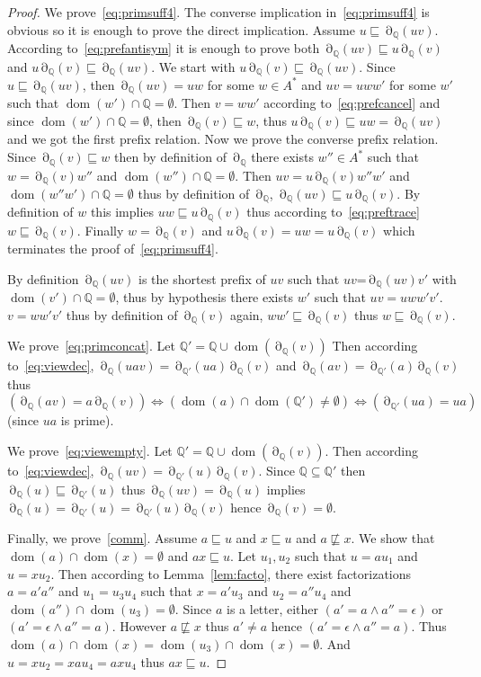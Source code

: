 \documentclass[a4paper,UKenglish]{lipics-v2016}
\newcommand{\QQ}{\mathbb{Q}}
\newcommand{\pref}{\sqsubseteq}
\DeclareMathOperator{\dom}{dom}
\DeclareMathOperator{\view}{\partial}
\begin{document}
\begin{proof}
We prove~\eqref{eq:primsuff4}.
The converse implication in~\eqref{eq:primsuff4} is obvious so it is enough 
to prove the direct implication.
Assume $u\pref \view_\QQ(uv)$.
According to~\eqref{eq:prefantisym}
it is enough to prove
both
$\view_\QQ(uv) \pref u\view_\QQ(v)$
and
$u\view_\QQ(v)\pref \view_\QQ(uv)$.
We start with $u\view_\QQ(v)\pref \view_\QQ(uv)$.
Since $u\pref \view_\QQ(uv)$, then $\view_\QQ(uv)=uw$ for some $w\in A^*$
and $uv=uww'$ for some $w'$ such that $\dom(w')\cap\QQ=\emptyset$.
Then $v=ww'$ according to~\eqref{eq:prefcancel}
and since $\dom(w')\cap \QQ=\emptyset$, then $\view_\QQ(v)\pref w$,
thus $u\view_\QQ(v)\pref uw=\view_\QQ(uv)$ and we got the first prefix relation.
Now we prove the converse prefix relation.
Since $\view_\QQ(v)\pref w$ then by definition of $\view_\QQ$ there exists $w''\in A^*$
such that $w=\view_\QQ(v) w''$ and $\dom(w'')\cap \QQ=\emptyset$.
Then $uv = u\view_\QQ(v) w''w'$ and $\dom(w''w')\cap\QQ=\emptyset$
thus by definition of $\view_\QQ$,
$\view_\QQ(uv) \pref u\view_\QQ(v)$.
By definition of $w$ this implies
$uw \pref u\view_\QQ(v)$ thus according to~\eqref{eq:preftrace}
$w\pref \view_\QQ(v)$. Finally $w=\view_\QQ(v)$
and $u\view_\QQ(v)=uw=u\view_\QQ(v)$
which terminates the proof of~\eqref{eq:primsuff4}.





By definition $\view_\QQ(uv)$ is the shortest prefix of $uv$
such that $uv$=$\view_\QQ(uv)v'$ with 
$\dom(v')\cap \QQ=\emptyset$,
thus by hypothesis there exists $w'$ such that $uv=uww'v'$.
$v=ww'v'$ thus by definition of $\view_\QQ(v)$ again,
$ww'\pref \view_\QQ(v)$ thus $w\pref\view_\QQ(v)$.


We prove~\eqref{eq:primconcat}.
Let $\QQ'=\QQ \cup \dom(\view_\QQ(v))$
Then according to~\eqref{eq:viewdec}, 
$\view_\QQ(uav)  = \view_{\QQ'}(ua) \view_\QQ(v)$
and
$\view_\QQ(av)  = \view_{\QQ'}(a) \view_\QQ(v)$
thus 
$(\view_\QQ(av)=a \view_\QQ(v)) \iff (\dom(a)\cap \dom(\QQ')\neq \emptyset) \iff (\view_{\QQ'}(ua)=ua)$ (since $ua$ is prime).

We prove~\eqref{eq:viewempty}.
Let $\QQ'=\QQ\cup \dom(\view_\QQ(v))$.
Then according to~\eqref{eq:viewdec},
$\view_\QQ(uv)=\view_{\QQ'}(u)\view_\QQ(v)$.
Since $\QQ\subseteq {\QQ'}$ then
$\view_\QQ(u)\pref \view_{\QQ'}(u)$
thus $\view_\QQ(uv)=\view_\QQ(u)$
implies $\view_\QQ(u)=\view_{\QQ'}(u)=\view_{\QQ'}(u)\view_\QQ(v)$
hence $\view_\QQ(v)= \emptyset$.

Finally, we prove~\eqref{comm}.
Assume $a \pref u$ and $x \pref u$
and $a\not \pref x$.
We show that $\dom(a)\cap \dom(x)=\emptyset$
and $ax \pref u$.
Let $u_1,u_2$ such that
$u=au_1$ and $u=xu_2$.
Then according to Lemma~\ref{lem:facto},
there exist factorizations $a=a'a''$ and
$u_1=u_3u_4$ such that $x=a'u_3$
and $u_2=a''u_4$ and $\dom(a'')\cap \dom(u_3)=\emptyset$.
Since $a$ is a letter, either 
$(a'=a \land a''=\epsilon)$
or
$(a'=\epsilon \land a''=a)$.
However $a \not \pref x$
thus $a'\neq a$ hence
$(a'=\epsilon \land a''=a)$.
Thus $\dom(a)\cap \dom(x)=\dom(u_3)\cap \dom(x)=\emptyset$. And $u=xu_2=xau_4=axu_4$ thus $ax \pref u$.
\end{proof}
\end{document}
